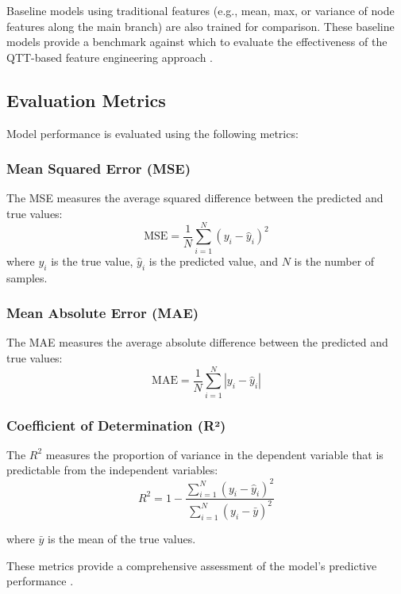 \documentclass[twocolumn]{aastex631}
\begin{document}
Baseline models using traditional features (e.g., mean, max, or variance of node features along the main branch) are also trained for comparison. These baseline models provide a benchmark against which to evaluate the effectiveness of the QTT-based feature engineering approach \citep{fujita2019haloconcentrationsnewbaseline}.

\subsection{Evaluation Metrics}
Model performance is evaluated using the following metrics: \citep{mishrasharma2024paperclipassociatingastronomicalobservations,narkedimilli2024predictingstellarmetallicitycomparative,raghav2024photometricanalysispredictingstar}

\subsubsection{Mean Squared Error (MSE)}
The MSE measures the average squared difference between the predicted and true values:
\[
\text{MSE} = \frac{1}{N} \sum_{i=1}^{N} (y_i - \hat{y}_i)^2
\]
\citep{prelogović2022machinelearningastrophysics21}
where \(y_i\) is the true value, \(\hat{y}_i\) is the predicted value, and \(N\) is the number of samples.

\subsubsection{Mean Absolute Error (MAE)}
The MAE measures the average absolute difference between the predicted and true values:
\[
\text{MAE} = \frac{1}{N} \sum_{i=1}^{N} |y_i - \hat{y}_i|
\]
\citep{raghav2024photometricanalysispredictingstar}

\subsubsection{Coefficient of Determination (R²)}
The \(R^2\) measures the proportion of variance in the dependent variable that is predictable from the independent variables:
\[
R^2 = 1 - \frac{\sum_{i=1}^{N} (y_i - \hat{y}_i)^2}{\sum_{i=1}^{N} (y_i - \bar{y})^2}
\]
\citep{narkedimilli2024predictingstellarmetallicitycomparative,raghav2024photometricanalysispredictingstar}

where \(\bar{y}\) is the mean of the true values.

These metrics provide a comprehensive assessment of the model's predictive performance \citep{huppenkothen2023constructingimpactfulmachinelearning,raghav2024photometricanalysispredictingstar}.
\end{document}
